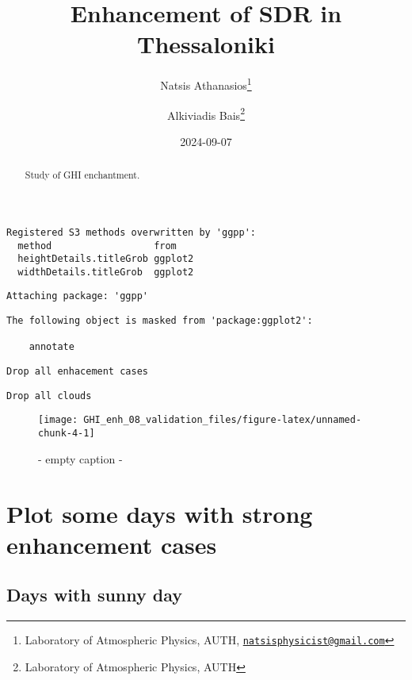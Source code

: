 \documentclass[
  10pt,
  a4paper,oneside]{article}
\title{Enhancement of SDR in Thessaloniki}
\author{Natsis Athanasios\footnote{Laboratory of Atmospheric Physics, AUTH, \href{mailto:natsisphysicist@gmail.com}{\nolinkurl{natsisphysicist@gmail.com}}} \and Alkiviadis Bais\footnote{Laboratory of Atmospheric Physics, AUTH}}
\date{2024-09-07}
\begin{document}
\maketitle
\begin{abstract}
Study of GHI enchantment.
\end{abstract}

{
\hypersetup{linkcolor=}
\setcounter{tocdepth}{4}
\tableofcontents
}
\begin{verbatim}
Registered S3 methods overwritten by 'ggpp':
  method                  from   
  heightDetails.titleGrob ggplot2
  widthDetails.titleGrob  ggplot2
\end{verbatim}

\begin{verbatim}
Attaching package: 'ggpp'
\end{verbatim}

\begin{verbatim}
The following object is masked from 'package:ggplot2':

    annotate
\end{verbatim}

\begin{verbatim}
Drop all enhacement cases
\end{verbatim}

\begin{verbatim}
Drop all clouds
\end{verbatim}

\begin{figure}[H]

{\centering \texttt{[image: GHI\_enh\_08\_validation\_files/figure-latex/unnamed-chunk-4-1]} 

}

\caption{ - empty caption - }\label{fig:unnamed-chunk-4}
\end{figure}

\FloatBarrier

\hypertarget{plot-some-days-with-strong-enhancement-cases}{%
\section{Plot some days with strong enhancement cases}\label{plot-some-days-with-strong-enhancement-cases}}

\FloatBarrier

\hypertarget{days-with-sunny-day}{%
\subsection{Days with sunny day}\label{days-with-sunny-day}}
\end{document}
